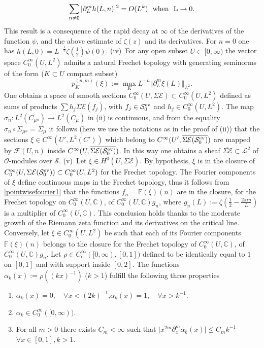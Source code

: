 \documentclass{pspum-l}
\theoremstyle{definition}
\theoremstyle{remark}
\numberwithin{equation}{section}
\def\C{{\mathbb C}}
\def\F{{\mathbb F}}
\def\cE{{\mathcal E}}
\def\cF{{\mathcal F}}
\def\cL{{\mathcal L}}
\def\cO{{\mathcal O}}
\def\cS{{\mathcal S}}
\def\fourier{\F}
\def\sr0{{\cS^{\rm ev}_0}}
\def\scal2{{\mathscr S}}
\begin{document}
\[
\sum_{n\neq 0} \vert\partial_L^m h(L,n)\vert^2=O(L^k) \ \ \rm{when} \ \ L\to 0.
\]
This result is a consequence of  the rapid decay at $\infty$ of the derivatives of the function $\psi$, and the above estimate of $\zeta(z)$ and its derivatives. For $n=0$ one has $h(L,0)=L^{-\frac 12}\zeta(\frac 12)\psi(0)$.
\newline
 (iv)~For any open subset $U\subset [0,\infty)$ the vector space $C_0^{\infty}(U,L^2)$ admits a natural Frechet topology with generating seminorms of the form ($K\subset U$ compact subset)
 \begin{equation}\label{seminorms}
 p_K^{(n,m)}(\xi):=\max_K L^{-n}\Vert \partial_L^m \xi(L)\Vert_{L^2}.
 \end{equation}
 One obtains a space of smooth sections $C_0^{\infty}(U,\Sigma\cE)\subset C_0^{\infty}(U,L^2)$ defined as sums of products  $\sum h_j\Sigma\cE(f_j)$, with $f_j\in  \sr0$ and $h_j\in C_0^{\infty}(U,L^2)$. The map $\sigma_n:L^2(C_{\mu^n})\to L^2(C_\mu)$ in (ii) is continuous, and  from the equality
 $\sigma_n\circ \Sigma_{\mu^n}=\Sigma_\mu$ it follows (here we use the notations as in the proof of (ii)) that the sections $\xi \in C^{\infty}(U',L^2(C'))$ which belong to $C^{\infty}(U',\overline{\Sigma\cE(\sr0)})$ are mapped by $\cF(U,n)$ inside $C^{\infty}(U,\overline{\Sigma\cE(\sr0)})$. In this way one obtains a sheaf $\overline{\Sigma\cE}\subset \cL^2$ of $\cO$-modules over $\scal2$.\newline
 (v)~Let $\xi \in H^0(U,\overline{\Sigma\cE})$. By hypothesis, $\xi$ is in the closure of  $C_0^{\infty}(U,\Sigma\cE(\sr0))\subset C_0^{\infty}(U,L^2)$ for the Frechet topology. The Fourier components of $\xi$ define continuous maps in the Frechet topology, thus it follows from \eqref{pointwisefourier1} that the functions  $f_n=\fourier(\xi)(n)$  are in the closure,  for the Frechet topology on $C_0^{\infty}(U,\C)$, of $C_0^{\infty}(U,\C)g_n$, where   $g_n(L):=\zeta\left(\frac 12-\frac{ 2\pi i n }{L}\right)$ is a  multiplier of $C_0^{\infty}(U,\C)$. This conclusion holds thanks to the moderate growth of the Riemann zeta function and its derivatives on the critical line. Conversely, let $\xi\in C_0^{\infty}(U,L^2)$ be such that each of its Fourier components $\fourier(\xi)(n)$ belongs to the closure  for the Frechet topology of $C_0^{\infty}(U,\C)$, of $C_0^{\infty}(U,\C)g_n$. Let $\rho\in C_c^{\infty}([0,\infty),[0,1])$ defined to be identically equal to $1$ on $[0,1]$ and with support inside $[0,2]$. The functions $\alpha_k(x):=\rho((kx)^{-1})$ ($k>1$) fulfill the following three properties
 \begin{enumerate}
 \item 	$\alpha_k(x)=0, \quad \forall x<(2k)^{-1}$,\qquad  $\alpha_k(x)=1, \quad \forall x>k^{-1}$.
 \item $\alpha_k\in C_0^{\infty}([0,\infty))$.
 \item For all $m >0$ there exists $C_m<\infty$ such that $\vert x^{2m}\partial_x^m\alpha_k(x)\vert\leq C_m k^{-1}$ $\forall x\in [0,1], k>1$.
 \end{enumerate}
\end{document}
